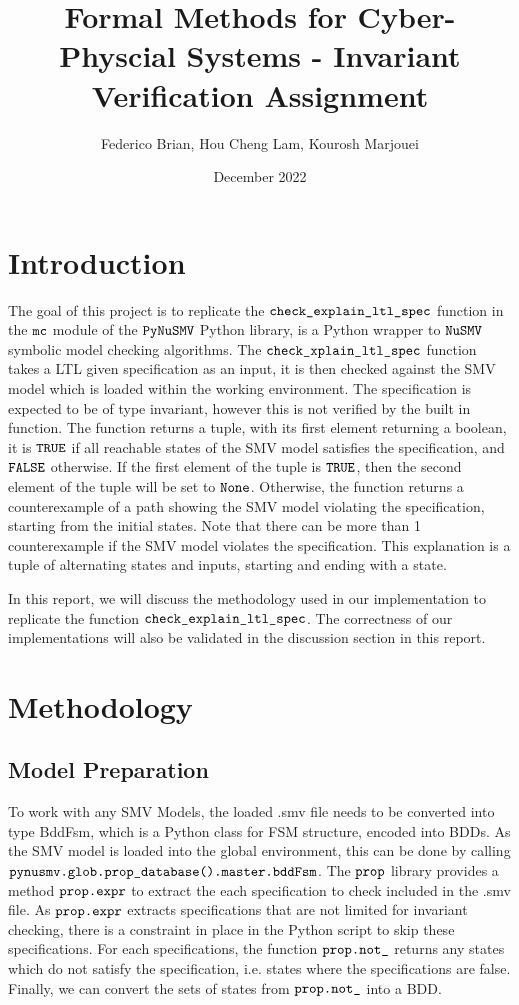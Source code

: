\documentclass{article}
\title{Formal Methods for Cyber-Physcial Systems - Invariant Verification Assignment}
\author{Federico Brian, Hou Cheng Lam, Kourosh Marjouei}
\date{December 2022}
\begin{document}
\maketitle
\tableofcontents

\newpage

\section{Introduction}

The goal of this project is to replicate the $\verb|check_explain_ltl_spec|$ function in the $\verb|mc|$ module of the $\verb|PyNuSMV|$ Python library, is a Python wrapper to $\verb|NuSMV|$ symbolic model checking algorithms. The $\verb|check_xplain_ltl_spec|$ function takes a LTL given specification as an input, it is then checked against the SMV model which is loaded within the working environment. The specification is expected to be of type invariant, however this is not verified by the built in function. The function returns a tuple, with its first element returning a boolean, it is $\verb|TRUE|$ if all reachable states of the SMV model satisfies the specification, and $\verb|FALSE|$ otherwise. If the first element of the tuple is $\verb|TRUE|$, then the second element of the tuple will be set to $\verb|None|$. Otherwise, the function returns a counterexample of a path showing the SMV model violating the specification, starting from the initial states. Note that there can be more than 1 counterexample if the SMV model violates the specification. This explanation is a tuple of alternating states and inputs, starting and ending with a state.

\medskip

In this report, we will discuss the methodology used in our implementation to replicate the function $\verb|check_explain_ltl_spec|$. The correctness of our implementations will also be validated in the discussion section in this report.

\section{Methodology}

\subsection{Model Preparation}

To work with any SMV Models, the loaded .smv file needs to be converted into type BddFsm, which is a Python class for FSM structure, encoded into BDDs. As the SMV model is loaded into the global environment, this can be done by calling $\verb|pynusmv.glob.prop_database().master.bddFsm|$. The $\verb|prop|$ library provides a method $\verb|prop.expr|$ to extract the each specification to check included in the .smv file. As $\verb|prop.expr|$ extracts specifications that are not limited for invariant checking, there is a constraint in place in the Python script to skip these specifications. For each specifications, the function $\verb|prop.not_|$ returns any states which do not satisfy the specification, i.e. states where the specifications are false. Finally, we can convert the sets of states from $\verb|prop.not_|$ into a BDD.
\end{document}
